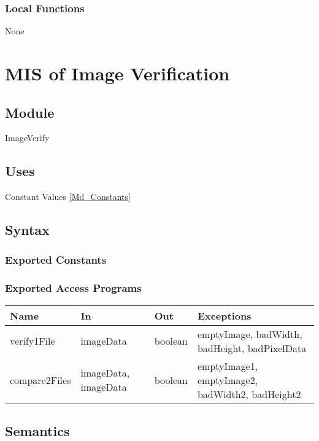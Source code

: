 \documentclass[12pt, titlepage]{article}
\begin{document}
\subsubsection{Local Functions}

None

\newpage

\section{MIS of Image Verification} \label{Md_Verify}

\subsection{Module}

ImageVerify

\subsection{Uses}

Constant Values \ref{Md_Constants}

\subsection{Syntax}

\subsubsection{Exported Constants}

\subsubsection{Exported Access Programs}

\begin{center}
\begin{tabular}{p{4cm} p{2cm} p{2cm} p{6cm}}
\hline
\textbf{Name} & \textbf{In} & \textbf{Out} & \textbf{Exceptions} \\
\hline
verify1File & imageData & boolean & emptyImage, badWidth, badHeight,
badPixelData\\
compare2Files & imageData, imageData & boolean & emptyImage1, emptyImage2,
badWidth2, badHeight2\\
\hline
\end{tabular}
\end{center}

\subsection{Semantics}
\end{document}
